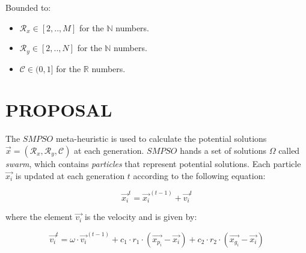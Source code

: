 \documentclass[spanish,twocolumn]{article}
\begin{document}
Bounded to:

\begin{itemize}
\item $\mathcal{R}_x \in [2,..,M]$ for the $\mathbb{N}$ numbers.
\item $\mathcal{R}_y \in [2,..,N]$ for the $\mathbb{N}$ numbers.
\item $\mathscr{C} \in (0,1]$ for the $\mathbb{R}$ numbers.
\end{itemize}

\section{PROPOSAL}
\label{sec:propuesta}

The $SMPSO$ \cite{4938830} meta-heuristic is used to calculate the potential solutions $\overrightarrow{x}=(\mathcal{R}_x, \mathcal{R}_y, \mathcal{C})$ at each generation. $SMPSO$ hands a set of solutions $\Omega$ called {\it swarm}, which contains {\it particles} that represent potential solutions. Each particle $\overrightarrow{x_i}$ is updated at each generation $t$ according to the following equation: 

\begin{equation}\label{eq:psobasico}
\overrightarrow{x_i}^t = \overrightarrow{x_i}^{(t-1)} + \overrightarrow{v_i}^t
\end{equation}

where the element $\overrightarrow{v_i}$ is the velocity and is given by:


\begin{equation}\label{eq:psobasico2}
\overrightarrow{v_i}^t = \omega \cdot \overrightarrow{v_i}^{(t-1)} + c_1 \cdot r_1 \cdot (\overrightarrow{x_{p_i}}-\overrightarrow{x_i}) + c_2 \cdot r_2 \cdot (\overrightarrow{x_{g_i}}-\overrightarrow{x_i})
\end{equation}
\end{document}
